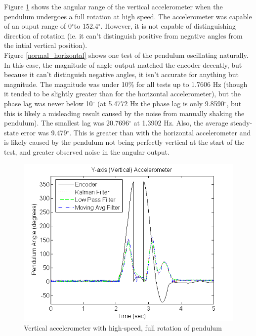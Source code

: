 \documentclass{article}
\theoremstyle{plain}
\theoremstyle{definition}
\theoremstyle{remark}
\begin{document}
Figure \ref{full_vertical} shows the angular range of the vertical accelerometer when the pendulum undergoes a full rotation at high speed. The accelerometer was capable of an ouput range of 0$^{\circ}$to 152.4$^{\circ}$. However, it is not capable of distinguishing direction of rotation (ie. it can't distinguish positive from negative angles from the intial vertical position). \\

Figure \ref{normal_horizontal} shows one test of the pendulum oscillating naturally. In this case, the magnitude of angle output matched the encoder decently, but because it can't distinguish negative angles, it isn't accurate for anything but magnitude. The magnitude was under 10\% for all tests up to 1.7606 Hz (though it tended to be slightly greater than for the horizontal accelerometer), but the phase lag was never below 10$^{\circ}$ (at 5.4772 Hz the phase lag is only 9.8590$^{\circ}$, but this is likely a misleading result caused by the noise from manually shaking the pendulum). The smallest lag was 20.7696$^{\circ}$ at 1.3902 Hz. Also, the average steady-state error was 9.479$^{\circ}$. This is greater than with the horizontal accelerometer and is likely caused by the pendulum not being perfectly vertical at the start of the test, and greater observed noise in the angular output.\\ 

\begin{figure}[hbt]
\begin{center}
\includegraphics[width = 12cm]{FullRotation_Vertical.png}
\caption{Vertical accelerometer with high-speed, full rotation of pendulum}
\label{full_vertical}
\end{center}
\end{figure}
\end{document}
